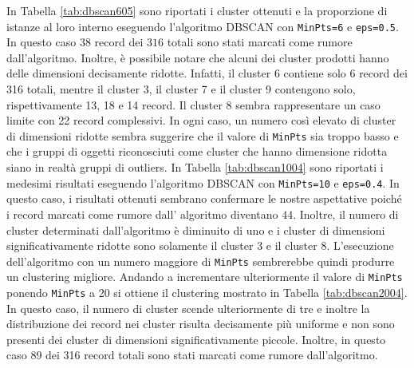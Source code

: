 \documentclass[12pt]{article}
\begin{document}
In Tabella \ref{tab:dbscan605} sono riportati i cluster ottenuti e la proporzione di istanze al loro interno eseguendo l'algoritmo DBSCAN con \texttt{MinPts=6} e \texttt{eps=0.5}. 
In questo caso $38$ record dei $316$ totali sono stati marcati come rumore dall'algoritmo.
Inoltre, è possibile notare che alcuni dei cluster prodotti hanno delle dimensioni decisamente ridotte. Infatti, il cluster 6 contiene solo 6 record dei 316 totali, mentre il cluster 3, il cluster 7 e il cluster 9 contengono solo, rispettivamente 13, 18 e 14 record.
Il cluster 8 sembra rappresentare un caso limite con 22 record complessivi.
In ogni caso, un numero così elevato di cluster di dimensioni ridotte sembra suggerire che il valore di \texttt{MinPts} sia troppo basso e che i gruppi di oggetti riconosciuti come cluster  che hanno dimensione ridotta siano in realtà gruppi di outliers.
In Tabella \ref{tab:dbscan1004} sono riportati i medesimi risultati eseguendo l'algoritmo DBSCAN con \texttt{MinPts=10} e \texttt{eps=0.4}. 
In questo caso, i risultati ottenuti sembrano confermare le nostre aspettative poiché i record marcati come rumore dall' algoritmo diventano $44$.
Inoltre, il numero di cluster determinati dall'algori\-tmo è diminuito di uno e i cluster di dimensioni significativamente ridotte sono solamente il cluster 3 e il cluster 8.
L'esecuzione dell'algoritmo con un numero maggiore di \texttt{MinPts} sembrerebbe quindi produrre un clustering migliore.
Andando a incrementare ulteriormente il valore di \texttt{MinPts} ponen\-do \texttt{MinPts} a 20 si ottiene il clustering mostrato in Tabella \ref{tab:dbscan2004}.
In questo caso, il numero di cluster scende ulteriormente di tre e inoltre la distribuzione dei record nei cluster risulta decisamente più uniforme e non sono presenti dei cluster di dimensioni significativamente piccole.
Inoltre, in questo caso 89 dei 316 record totali sono stati marcati come rumore dall'algoritmo.
\end{document}
